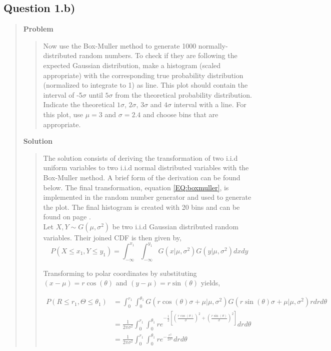
\subsection*{\textbf{Question 1.b)}}
\begin{quote}

\textbf{Problem}
\begin{quote}Now use the Box-Muller method to generate 1000 normally-distributed random numbers. To check if they are following the expected Gaussian distribution, make a histogram (scaled appropriate) with the corresponding true probability distribution (normalized to integrate to 1) as line. This plot should contain the interval of -5$\sigma$ until $5\sigma$ from the theoretical probability distribution. Indicate the theoretical $1\sigma$, $2\sigma$, $3\sigma$ and $4\sigma$ interval with a line. For this plot, use $\mu =3$ and $\sigma = 2.4$ and choose bins that are appropriate.
\end{quote}

\textbf{Solution} 



\begin{quote}
The solution consists of deriving the  transformation of two i.i.d uniform variables to two i.i.d normal distributed variables with the Box-Muller method. A brief form of the derivation can be found below. The final transformation, equation \ref{EQ:boxmuller}, is  implemented in the random number generator and used to generate the plot. The final histogram is created with 20 bins and can be found on page \pageref{fig:normal}.
\\


Let $X, Y \sim G(\mu, \sigma ^2)$ be two i.i.d Gaussian distributed random variables. Their joined CDF is then given by, 
\begin{equation}
P(X \leq x_1, Y \leq y_1) =  \int_{-\infty}^{x_1} \int_{-\infty}^{y_1} G(x| \mu, \sigma^2) G(y| \mu, \sigma^2) dx dy
\end{equation}

Transforming to polar coordinates by substituting $ (x-\mu) = r \cos(\theta)$ and $ (y-\mu) = r\sin(\theta)$ yields,

\begin{align*}
P(R \leq r_1, \Theta \leq \theta_1) &= \int_0^{r_1} \int_{0}^{\theta_1} G(r\cos(\theta) \sigma + \mu| \mu, \sigma^2) G(r\sin(\theta) \sigma + \mu| \mu, \sigma^2) r dr d\theta \\
&= \frac{1}{2 \pi \sigma^2} \int_0^{r_1} \int_{0}^{\theta_1} re^{ -\frac{1}{2} \left[ \left( \frac{r\cos(\theta)}{\sigma} \right)^2  + \left( \frac{r\sin(\theta)}{\sigma} \right)^2 \right]}  dr d\theta \\
&=  \frac{1}{2 \pi \sigma^2} \int_0^{r_1} \int_{0}^{\theta_1} re^{ -\frac{r^2}{2 \sigma ^2} } dr d\theta
\end{align*}


\end{quote}
\end{quote}
